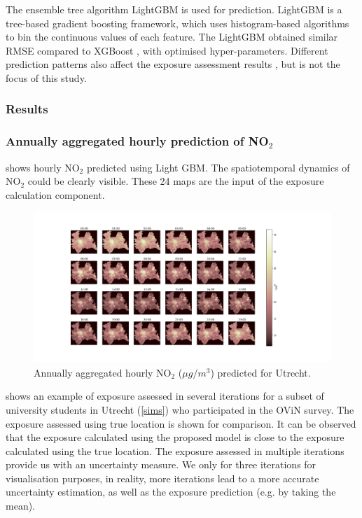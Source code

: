 \documentclass[]{article}
\begin{document}
The ensemble tree algorithm LightGBM \citep{ke2017lightgbm} is used for prediction. LightGBM is a tree-based gradient boosting framework, which uses histogram-based algorithms to bin the continuous values of each feature. The LightGBM obtained similar RMSE compared to XGBoost \citep{chen2015xgboost}, with optimised hyper-parameters. Different prediction patterns also affect the exposure assessment results \citep{yoo2021impact,yoo2015geospatial}, but is not the focus of this study. %
 
\subsubsection{Results}

\subsubsection{Annually aggregated hourly prediction of NO$_2$}

 shows hourly NO$_2$ predicted using Light GBM. The spatiotemporal dynamics of NO$_2$ could be clearly visible. These 24 maps are the input of the exposure calculation component. 

\begin{figure}[h]
    \centering
        \includegraphics[scale = 0.3]{figure/prediUt.png}
    \caption{Annually aggregated hourly NO$_2$ ($\mu g / m^3$) predicted for Utrecht.}
    \label{con}
\end{figure}


 shows an example of exposure assessed in several iterations for a subset of university students in Utrecht (\cref{sims}) who participated in the OViN survey. The exposure assessed using true location is shown for comparison. It can be observed that the exposure calculated using the proposed model is close to the exposure calculated using the true location. The exposure assessed in multiple iterations provide us with an uncertainty measure. We only for three iterations for visualisation purposes, in reality, more iterations lead to a more accurate uncertainty estimation, as well as the exposure prediction (e.g. by taking the mean). 
\end{document}
